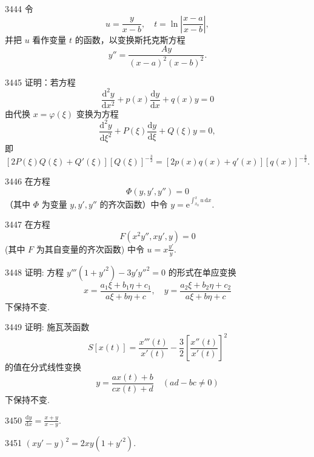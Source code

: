 \begin{prob}[M]{3444}
令
\[
u = \frac{y}{x - b}, \quad t = \ln\left|\frac{x - a}{x - b}\right|,
\]
并把 $u$ 看作变量 $t$ 的函数，以变换斯托克斯方程
\[
y'' = \frac{Ay}{(x - a)^2 (x - b)^2}.
\]
\end{prob}

\begin{prob}[M]{3445}
证明：若方程
\[
\frac{\mathrm{d}^2 y}{\mathrm{d}x^2} + p(x)\frac{\mathrm{d}y}{\mathrm{d}x} + q(x)y = 0
\]
由代换 $x = \varphi(\xi)$ 变换为方程
\[
\frac{\mathrm{d}^2 y}{\mathrm{d}\xi^2} + P(\xi)\frac{\mathrm{d}y}{\mathrm{d}\xi} + Q(\xi)y = 0,
\]
即
\[
[2P(\xi)Q(\xi) + Q'(\xi)][Q(\xi)]^{-\frac{3}{2}} = [2p(x)q(x) + q'(x)][q(x)]^{-\frac{3}{2}}.
\]
\end{prob}

\begin{prob}[S]{3446}
在方程
\[
\Phi(y, y', y'') = 0
\]
（其中 $\Phi$ 为变量 $y, y', y''$ 的齐次函数）中令 $y = \mathrm{e}^{\int_{x_0}^x u\,\mathrm{d}x}$.
\end{prob}

\begin{prob}[M]{3447}
在方程
\[
F(x^2 y'', xy', y) = 0
\]
(其中 $F$ 为其自变量的齐次函数) 中令 $u = x\frac{y'}{y}$.
\end{prob}

\begin{prob}[L]{3448}
证明: 方程 $y'''(1+y'^2)-3y'y''^2=0$ 的形式在单应变换
\[
x = \frac{a_1\xi+b_1\eta+c_1}{a\xi+b\eta+c}, \quad y = \frac{a_2\xi+b_2\eta+c_2}{a\xi+b\eta+c}
\]
下保持不变.
\end{prob}

\begin{prob}[M]{3449}
证明: 施瓦茨函数
\[
S[x(t)] = \frac{x'''(t)}{x'(t)} - \frac{3}{2}\left[\frac{x''(t)}{x'(t)}\right]^2
\]
的值在分式线性变换
\[
y = \frac{ax(t)+b}{cx(t)+d} \quad (ad - bc \neq 0)
\]
下保持不变.
\end{prob}


\begin{prob}[S]{3450}
$\frac{\mathrm{d}y}{\mathrm{d}x} = \frac{x+y}{x-y}$.
\end{prob}

\begin{prob}[S]{3451}
$(xy'-y)^2 = 2xy(1+y'^2)$.
\end{prob}

